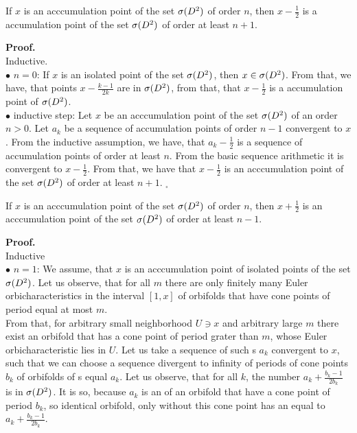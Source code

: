 \begin{lemma}\label{first_order_lemma}
If $x$ is an acccumulation point of the set ${\mathcal{\sigma}(D^2)}$ of order $n$, then $x-\frac{1}{2}$ is a
 accumulation point of the set ${\mathcal{\sigma}(D^2)}$ of order at least $n+1$. 
\end{lemma}
\textbf{Proof.} \\
Inductive. \\
$\bullet$ $n = 0$: If $x$ is an isolated point of the set ${\mathcal{\sigma}(D^2)}$, then $x \in {\mathcal{\sigma}(D^2)}$. From that, we 
have, that points $x - \frac{k-1}{2k}$ are in ${\mathcal{\sigma}(D^2)}$, from that, that $x-\frac{1}{2}$ is a 
accumulation point of ${\mathcal{\sigma}(D^2)}$. \\
$\bullet$ inductive step: Let $x$ be an acccumulation point of the set ${\mathcal{\sigma}(D^2)}$ of an order $n > 0$. 
Let $a_k$ be a sequence of accumulation points of order $n-1$ convergent to $x$. From the 
inductive assumption, we have, that $a_k - \frac{1}{2}$ is a sequence of accumulation points 
of order at least $n$. From the basic sequence arithmetic it is convergent to $x-\frac{1}{2}$. 
From that, we have that $x-\frac{1}{2}$ is an acccumulation point of the set ${\mathcal{\sigma}(D^2)}$ of order 
at least $n+1$. $_\square$
\begin{lemma}\label{second_order_lemma}
If $x$ is an acccumulation point of the set ${\mathcal{\sigma}(D^2)}$ of order $n$, then $x+\frac{1}{2}$ is 
an acccumulation point of the set ${\mathcal{\sigma}(D^2)}$ of order at least $n-1$.  
\end{lemma}
\noindent\textbf{Proof.} \\
Inductive \\
$\bullet$ $n = 1$: We assume, that $x$ is an acccumulation point of isolated points of the set 
${\mathcal{\sigma}(D^2)}$. Let us observe, that for all $m$ there are only finitely many Euler orbicharacteristics 
in the interval $[1,x]$ of orbifolds that have cone points of period equal at most $m$. \\ 
From that, for arbitrary small neighborhood $U \ni x$ and arbitrary large $m$ there exist an orbifold 
that has a cone point of period grater than $m$, whose Euler orbicharacteristic lies in $U$. 
Let us take a sequence of such \Eoc s $a_k$ convergent to $x$, such that we can choose 
a sequence divergent to infinity of periods of cone points $b_k$ of orbifolds of \Eoc s equal $a_k$. 
Let us observe, that for all $k$, the number $a_k+\frac{b_k-1}{2b_k}$ is in ${\mathcal{\sigma}(D^2)}$. 
It is so, because $a_k$ is an \Eoc of an orbifold that have a cone point of period $b_k$, so 
identical orbifold, only without this cone point has an \Eoc equal to $a_k + \frac{b_k-1}{2b_k}$. 
